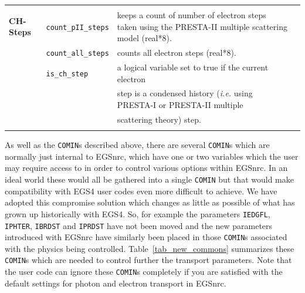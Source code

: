 \begin{table}[htb]
\begin{center}
\begin{tabular}{ l  l   p{105mm}l  |}
    &&\\
   \hline
&&\\
{\bfseries CH-Steps} & {\tt count\_pII\_steps} & keeps a count of number of
electron steps taken using the PRESTA-II multiple scattering model
(real*8).\\
& {\tt count\_all\_steps} & counts all electron steps (real*8).\\
& {\tt is\_ch\_step} & a logical variable set to true if the current electron\\
&& step is a condensed history ({\em i.e.} using PRESTA-I or PRESTA-II multiple\\
&& scattering theory) step.\\
&&\\
   \end{tabular}
   \end{center}
\end{table}

\clearpage

As well as the {\tt COMIN}s described above, there are several {\tt COMIN}s which are
normally just internal to EGSnrc, which have one or two variables which the
user may require access to in order to control various options within
 EGSnrc.  In an ideal world these would all be gathered into a single
{\tt COMIN}
but that would make compatibility with EGS4 user codes even more difficult
to achieve.  We have adopted this compromise solution which changes as
little as possible of what has grown up historically with EGS4.  So, for
example the parameters {\tt IEDGFL}, {\tt IPHTER},
{\tt IBRDST} and {\tt IPRDST} have not been
moved and the new parameters introduced with EGSnrc have similarly been
placed in those {\tt COMIN}s associated with the physics being controlled.
Table~\ref{tab_new_commons} summarizes these {\tt COMIN}s which are needed to
control further the transport parameters.  Note that the user code can
ignore these {\tt COMIN}s completely if you are satisfied with the default
settings for photon and electron transport in EGSnrc.
 
\clearpage

